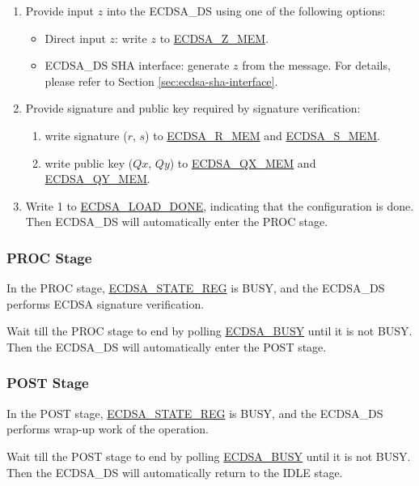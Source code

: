 \documentclass[main\_\_EN.tex]{subfiles}
\begin{document}
\begin{enumerate}
	\item Provide input $z$ into the ECDSA\_DS using one of the following options:
	      \begin{itemize}
		      \item Direct input $z$: write $z$ to \hyperref[tab:ecdsa-memory]{ECDSA\_Z\_MEM}.
		      \item ECDSA\_DS SHA interface: generate $z$ from the message. For details, please refer to Section \ref{sec:ecdsa-sha-interface}.
	      \end{itemize}
		      \item Provide signature and public key required by signature verification:
		            \begin{enumerate}
			            \item write signature ($r$, $s$) to \hyperref[tab:ecdsa-memory]{ECDSA\_R\_MEM} and \hyperref[tab:ecdsa-memory]{ECDSA\_S\_MEM}.
			            \item write public key ($Qx$, $Qy$) to \hyperref[tab:ecdsa-memory]{ECDSA\_QX\_MEM} and \hyperref[tab:ecdsa-memory]{ECDSA\_QY\_MEM}.
		            \end{enumerate}
	\item Write 1 to \hyperref[fielddesc:ECDSALOADDONE]{ECDSA\_LOAD\_DONE}, indicating that the configuration is done. Then ECDSA\_DS will automatically enter the PROC stage.
\end{enumerate}

\subsubsection{PROC Stage}

In the PROC stage, \hyperref[regdesc:ECDSASTATEREG]{ECDSA\_STATE\_REG} is BUSY, and the ECDSA\_DS performs ECDSA signature verification.

Wait till the PROC stage to end by polling \hyperref[fielddesc:ECDSABUSY]{ECDSA\_BUSY} until it is not BUSY. Then the ECDSA\_DS will automatically enter the POST stage.


\subsubsection{POST Stage}

In the POST stage, \hyperref[regdesc:ECDSASTATEREG]{ECDSA\_STATE\_REG} is BUSY, and the ECDSA\_DS performs wrap-up work of the operation.

Wait till the POST stage to end by polling \hyperref[fielddesc:ECDSABUSY]{ECDSA\_BUSY} until it is not BUSY. Then the ECDSA\_DS will automatically return to the IDLE stage.
\end{document}
